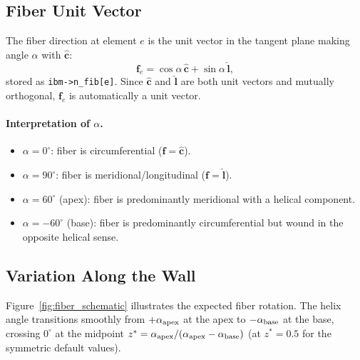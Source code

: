 \documentclass[11pt,a4paper]{article}
\newcommand{\bl}{\hat{\mathbf{l}}}
\newcommand{\bc}{\hat{\mathbf{c}}}
\newcommand{\bff}{\mathbf{f}}
\begin{document}
\subsection{Fiber Unit Vector}

The fiber direction at element $e$ is the unit vector in the tangent plane
making angle $\alpha$ with $\bc$:
\begin{equation}
  \boxed{
    \bff_e = \cos\alpha\,\bc + \sin\alpha\,\bl,
  }
  \label{eq:fiber_vec}
\end{equation}
stored as \texttt{ibm->n\_fib[e]}.  Since $\bc$ and $\bl$ are both unit
vectors and mutually orthogonal, $\bff_e$ is automatically a unit vector.

\paragraph{Interpretation of $\alpha$.}
\begin{itemize}
  \item $\alpha = 0^\circ$: fiber is circumferential ($\bff = \bc$).
  \item $\alpha = 90^\circ$: fiber is meridional/longitudinal ($\bff = \bl$).
  \item $\alpha = 60^\circ$ (apex): fiber is predominantly meridional with a
        helical component.
  \item $\alpha = -60^\circ$ (base): fiber is predominantly circumferential
        but wound in the opposite helical sense.
\end{itemize}

\subsection{Variation Along the Wall}

Figure~\ref{fig:fiber_schematic} illustrates the expected fiber rotation.
The helix angle transitions smoothly from $+\alpha_{\rm apex}$ at the apex to
$-\alpha_{\rm base}$ at the base, crossing $0^\circ$ at the midpoint
$z^* = \alpha_{\rm apex}/(\alpha_{\rm apex} - \alpha_{\rm base})$ (at
$z^* = 0.5$ for the symmetric default values).
\end{document}
